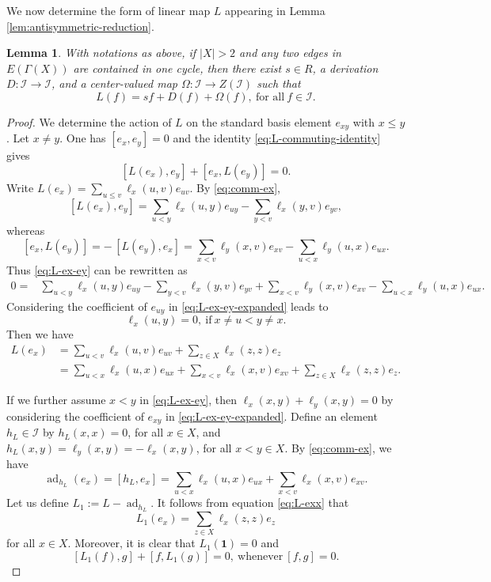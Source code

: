 \documentclass[reqno]{amsart}
\numberwithin{equation}{section}
\theoremstyle{plain}
\newtheorem{lemma}[theorem]{Lemma}
\theoremstyle{definition}
\newcommand{\I}{\mathcal I}
\newcommand{\one}{\mathbf 1}
\newcommand{\ad}{\operatorname{ad}}
\begin{document}
We now determine the form of linear map $L$ appearing in Lemma \ref{lem:antisymmetric-reduction}.

\begin{lemma}\label{lem:commuting-L-structure}
With notations as above, if $|X|>2$ and any two edges in $E(\Gamma(X))$ are contained in one cycle,
then there exist
$s\in R$, a derivation $D:\I\to\I$, and a center-valued map
$\Omega:\I\to Z(\I)$ such that
\begin{equation}\label{eq:L-structure}
L(f)=sf+D(f)+\Omega(f),~\text{for~all}~f\in\I.
\end{equation}
\end{lemma}

\begin{proof}
We determine the action of $L$ on the standard basis element $e_{xy}$ with $x\leq y$.
Let $x\neq y$. One has $[e_x,e_y]=0$ and the identity \eqref{eq:L-commuting-identity} gives
\begin{equation}\label{eq:L-ex-ey}
[L(e_x),e_y]+[e_x,L(e_y)]=0.
\end{equation}
Write $L(e_x)=\sum_{u\leq v}\ell_x(u,v)e_{uv}$.
By \eqref{eq:comm-ex},
\[
[L(e_x),e_y]
=\sum_{u<y}\ell_x(u,y)e_{uy}
-\sum_{y<v}\ell_x(y,v)e_{yv},
\]
whereas
\[
[e_x,L(e_y)]
=-\,[L(e_y),e_x]
=\sum_{x<v}\ell_y(x,v)e_{xv}
-\sum_{u<x}\ell_y(u,x)e_{ux}.
\]
Thus \eqref{eq:L-ex-ey} can be rewritten as
\begin{equation}\label{eq:L-ex-ey-expanded}
\begin{aligned}
0={}&
\sum_{u<y}\ell_x(u,y)e_{uy}
-\sum_{y<v}\ell_x(y,v)e_{yv}+\sum_{x<v}\ell_y(x,v)e_{xv}
-\sum_{u<x}\ell_y(u,x)e_{ux}.
\end{aligned}
\end{equation}
Considering the coefficient of $e_{uy}$ in \eqref{eq:L-ex-ey-expanded} leads to
\begin{equation}\label{eq:L-ex-away}
\ell_x(u,y)=0, ~\text{if}~x\neq u<y\neq x.
\end{equation}
Then we have
\begin{align}
L(e_x)&=\sum_{u< v}\ell_x(u,v)e_{uv}+\sum_{z\in X}\ell_x(z,z)e_{z}\nonumber\\
&=\sum_{u<x}\ell_x(u,x)e_{ux}+\sum_{x<v}\ell_x(x,v)e_{xv}+\sum_{z\in X}\ell_x(z,z)e_{z}.\label{eq:L-exx}
\end{align}

If we further assume $x<y$ in \eqref{eq:L-ex-ey}, then $\ell_x(x,y)+\ell_y(x,y)=0$ by
considering the coefficient of $e_{xy}$ in \eqref{eq:L-ex-ey-expanded}.
Define an element $h_L\in\mathcal I$ by $h_L(x,x)=0$, for all $x\in X$,
and $h_L(x,y)=\ell_y(x,y)=-\ell_x(x,y)$, for all $x<y\in X$.
By \eqref{eq:comm-ex}, we have
\[
\ad_{h_L}(e_x)=[h_L,e_x]=\sum_{u<x}\ell_x(u,x)e_{ux}+\sum_{x<v}\ell_x(x,v)e_{xv}.
\]
Let us define $L_1:=L-\ad_{h_L}$. It follows from equation \eqref{eq:L-exx} that
\begin{equation}\label{eq:L1-ex-diagonal}
L_1(e_x)=\sum_{z\in X}\ell_x(z,z)e_z
\end{equation}
for all $x\in X$. Moreover, it is clear that $L_1(\one)=0$ and
\begin{equation}\label{eq:L1-commuting}
[L_1(f),g]+[f,L_1(g)]=0,~\text{whenever}~[f,g]=0.
\end{equation}


\end{proof}
\end{document}
